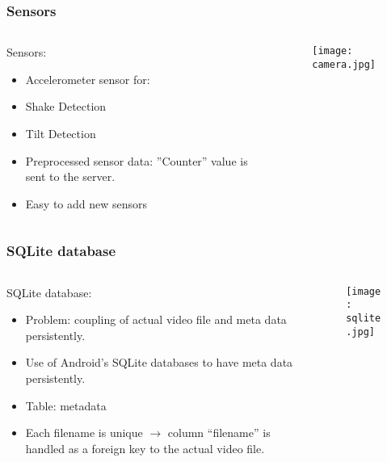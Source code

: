\begin{frame}	
	\frametitle{Sensors}
	\begin{columns}[t]
		\begin{column}[t]{0.5\linewidth}
			Sensors:
			\begin{itemize}
				\item Accelerometer sensor for:
				\item Shake Detection
				\item Tilt Detection
				\item Preprocessed sensor data: ”Counter” value is sent to the server.
				\item Easy to add new sensors
			\end{itemize}
		\end{column}
		\begin{column}[t]{0.5\linewidth}
			\begin{figure}[!t]
				\centering
				\texttt{[image: camera.jpg]}
				\label{fig:camera1}
			\end{figure}
		\end{column}				
	\end{columns}	
\end{frame}

\begin{frame}	
	\frametitle{SQLite database}
	\begin{columns}[t]
		\begin{column}[t]{0.5\linewidth}
			SQLite database:
				\begin{itemize}
					\item Problem: coupling of actual video file and meta data persistently. 
					\item Use of Android's SQLite databases to have meta data persistently.
					\item Table: metadata
					\item Each filename is unique $\rightarrow$ column ``filename'' is handled as a foreign key to the actual video file.
				\end{itemize}
		\end{column}
		\begin{column}[t]{0.5\linewidth}
			\begin{figure}[!t]
				\centering
				\texttt{[image: sqlite.jpg]}
				\label{fig:sqlite}
			\end{figure}
		\end{column}
	\end{columns}		
\end{frame}

